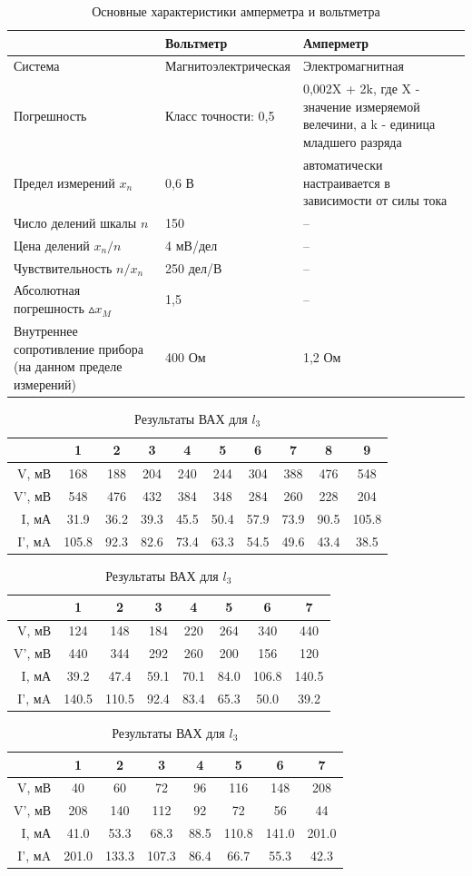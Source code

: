 \documentclass[a4paper, 10pt]{article}%
\begin{document}
\begin{table}
\caption{Основные характеристики амперметра и вольтметра}
\begin{tabular}{|p{3cm}|p{5cm}|p{5cm}|}
\hline
& Вольтметр & Амперметр \\
\hline
Система & Магнитоэлектрическая & Электромагнитная\\
\hline
Погрешность& Класс точности: 0,5& 0,002X + 2k, где X - значение измеряемой велечини, а k - единица младшего разряда\\
\hline
Предел измерений $ x_{n} $& 0,6 В & автоматически настраивается в зависимости от силы тока \\
\hline
Число делений шкалы $n$& 150 & -- \\
\hline
Цена делений $x_n / n$& 4 мВ/дел & -- \\
\hline
Чувствительность $ n / x_n$& 250 дел/В & --\\
\hline
Абсолютная погрешность $ \vartriangle x_M$& 1,5&--\\
\hline
Внутреннее сопротивление прибора (на данном пределе измерений)& 400 Ом & 1,2 Ом\\
\hline
\end{tabular}
\end{table}
\begin{table}
\caption{Результаты ВАХ для $l_1$}
\begin{tabular}{|r|c|c|c|c|c|c|c|c|c|}
\hline
&1&2&3&4&5&6&7&8&9 \\
\hline
V, мВ& 168 & 188 & 204 & 240 & 244 & 304 & 388 & 476 & 548 \\
\hline
V', мВ& 548 & 476 & 432 & 384 & 348 & 284 & 260 & 228 & 204\\
\hline
I, мА& 31.9 & 36.2 & 39.3 & 45.5 & 50.4 & 57.9 & 73.9 & 90.5 & 105.8\\
\hline
I', мA& 105.8 & 92.3 & 82.6 & 73.4 & 63.3 & 54.5 & 49.6 & 43.4 & 38.5 \\
\hline
\end{tabular}
\caption{Результаты ВАХ для $l_2$}
\begin{tabular}{|r|c|c|c|c|c|c|c|}
\hline
&1&2&3&4&5&6&7 \\
\hline
V, мВ& 124 & 148 & 184 & 220 & 264 & 340 & 440 \\
\hline
V', мВ& 440 & 344 & 292 & 260 & 200 & 156 & 120\\
\hline
I, мА& 39.2 & 47.4 & 59.1 & 70.1 & 84.0 & 106.8 & 140.5\\
\hline
I', мA& 140.5 & 110.5 & 92.4 & 83.4 & 65.3 & 50.0 & 39.2\\
\hline
\end{tabular}
\caption{Результаты ВАХ для $l_3$}
\begin{tabular}{|r|c|c|c|c|c|c|c|}
\hline
&1&2&3&4&5&6&7 \\
\hline
V, мВ& 40 & 60 & 72 & 96 & 116 & 148 & 208 \\
\hline
V', мВ& 208 & 140 & 112 & 92 & 72 & 56 & 44\\
\hline
I, мА& 41.0 & 53.3 & 68.3 & 88.5 & 110.8 & 141.0 & 201.0\\
\hline
I', мA& 201.0 & 133.3 & 107.3 & 86.4 & 66.7 & 55.3 & 42.3 \\
\hline
\end{tabular}
\end{table}
\end{document}
